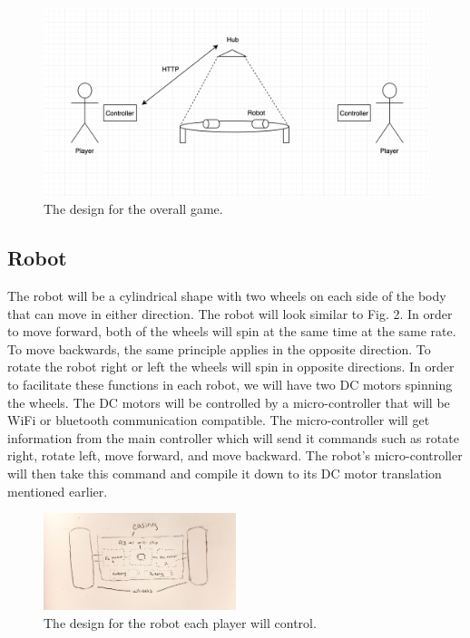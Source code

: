\documentclass[11pt]{ieeeconf}
\begin{document}
 \begin{figure}[!t]
  \centering
  \captionsetup{justification=centering}
      \includegraphics[width=14cm]{images/Overall.png}
        \caption{The design for the overall game.}
        \label{Illustration}
\end{figure}

\subsection{Robot}

The robot will be a cylindrical shape with two wheels on each side of the body that can move in either direction. The robot will look similar to Fig. 2. In order to move forward, both of the wheels will spin at the same time at the same rate. To move backwards, the same principle applies in the opposite direction. To rotate the robot right or left the wheels will spin in opposite directions. In order to facilitate these functions in each robot, we will have two DC motors spinning the wheels. The DC motors will be controlled by a micro-controller that will be WiFi or bluetooth communication compatible. The micro-controller will get information from the main controller which will send it commands such as rotate right, rotate left, move forward, and move backward. The robot's micro-controller will then take this command and compile it down to its DC motor translation mentioned earlier.

 \begin{figure}[h]
  \centering
      \includegraphics[width=0.5\textwidth]{images/RobotSketch.pdf}
        \caption{The design for the robot each player will control.}
        \label{RobotFig}
\end{figure}
\end{document}
